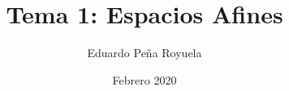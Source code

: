 \documentclass[a4paper,12pt]{article}
\title{Tema 1: Espacios Afines}
\author{Eduardo Peña Royuela}
\date{Febrero 2020}
\begin{document}
\maketitle



\pagebreak


\end{document}
